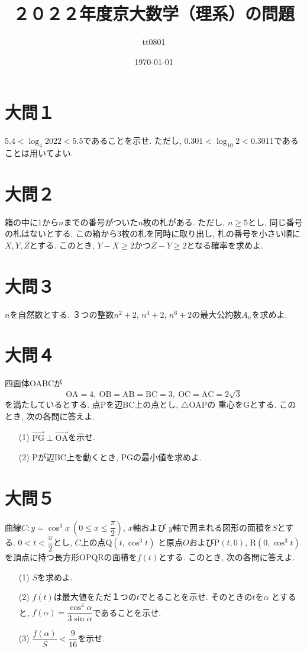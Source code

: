 \documentclass[dvipdfmx,a4paper]{jsarticle}
\title{２０２２年度京大数学（理系）の問題}
\author{tt0801}
\date{\today}
\newcommand{\al}{\alpha}
\newcommand{\oraw}{\overrightarrow}
\newcommand{\2}{I\hspace{-1pt}I}
\newcommand{\3}{I\hspace{-1pt}I\hspace{-1pt}I}
\begin{document}
    \maketitle
    \section{大問１}
    $5.4 < \log_4 2022 < 5.5$であることを示せ. ただし, $0.301 < \log_{10} 2 < 0.3011$であることは用いてよい. 

    \section{大問２}
    箱の中に1から$n$までの番号がついた$n$枚の札がある. ただし, $n\geq 5$とし, 同じ番号の札はないとする. 
    この箱から3枚の札を同時に取り出し, 札の番号を小さい順に$X, Y, Z$とする. このとき, 
    $Y-X \geq 2$かつ$Z-Y \geq 2$となる確率を求めよ. 



    \section{大問３}
    $n$を自然数とする. ３つの整数$n^2+2$, $n^4+2$, $n^6+2$の最大公約数$A_n$を求めよ. 


    \section{大問４}
    四面体OABCが
    \begin{equation*}
        \mathrm{
            OA = 4,\ OB=AB=BC=3,\ OC=AC=2\sqrt{3}
        }
    \end{equation*}
    を満たしているとする. 点Pを辺BC上の点とし, $\triangle \mathrm{OAP}$の
    重心をGとする. このとき, 次の各問に答えよ. 
    \begin{itemize}
        \item [(1)] $\oraw{\mathrm{PG}} \perp \oraw{\mathrm{OA}}$を示せ. 
        \item [(2)] Pが辺BC上を動くとき, PGの最小値を求めよ. 
    \end{itemize}

    
    \section{大問５}
    曲線$C: y=\cos ^3 x \ \left(0 \leq x \leq \dfrac{\pi}{2}\right)$, $x$軸および
    $y$軸で囲まれる図形の面積を$S$とする. $0<t<\dfrac{\pi}{2}$とし, $C$上の点Q$(t, \cos ^3 t)$
    と原点$O$およびP$(t,0)$, R$(0, \cos ^3 t)$を頂点に持つ長方形OPQRの面積を$f(t)$とする. 
    このとき, 次の各問に答えよ. 
    \begin{itemize}
        \item [(1)] $S$を求めよ. 
        \item [(2)] $f(t)$は最大値をただ１つの$t$でとることを示せ. そのときの$t$を$\al$
        とすると, $f(\al) = \dfrac{\cos ^4 \al}{3 \sin \al}$であることを示せ. 
        \item [(3)] $\dfrac{f(\al)}{S} < \dfrac{9}{16}$を示せ. 
    \end{itemize}
\end{document}
